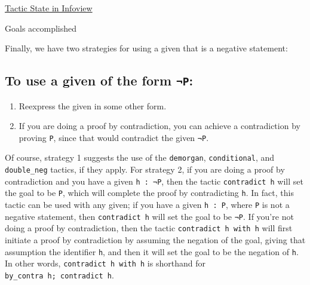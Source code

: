 \documentclass[
  letterpaper,
  DIV=11,
  numbers=noendperiod]{scrreprt}
\newenvironment{Shaded}{\begin{snugshade}}{\end{snugshade}}
\newcommand{\NormalTok}[1]{\textcolor[rgb]{0.00,0.23,0.31}{#1}}
\newcommand{\SpecialCharTok}[1]{\textcolor[rgb]{0.37,0.37,0.37}{#1}}
\providecommand{\tightlist}{%
  \setlength{\itemsep}{0pt}\setlength{\parskip}{0pt}}\usepackage{longtable,booktabs,array}
\renewcommand{\NormalTok}[1]{\textcolor[HTML]{000000}{#1}}
\renewcommand{\SpecialCharTok}[1]{}
\newcommand{\nobreakShaded}{\renewenvironment{Shaded}
	{\begin{tcolorbox}[frame hidden, enhanced, interior hidden, boxrule=0pt,
		borderline west={3pt}{0pt}{shadecolor}, sharp corners]}
	{\end{tcolorbox}}}
\newenvironment{outpt}
	{\nobreakShaded\begin{minipage}[t]{0.32\textwidth}}
	{\end{minipage}}
\theoremstyle{remark}
\begin{document}
\begin{outpt}

\uline{Tactic State in Infoview}

\begin{Shaded}
\begin{Highlighting}[]
\SpecialCharTok{!!}\NormalTok{Goals accomplished 🎉}
\end{Highlighting}
\end{Shaded}

\end{outpt}

Finally, we have two strategies for using a given that is a negative
statement:

\hypertarget{to-use-a-given-of-the-form-p}{%
\subsection{\texorpdfstring{To use a given of the form
\texttt{¬P}:}{To use a given of the form ¬P:}}\label{to-use-a-given-of-the-form-p}}

\begin{enumerate}
\def\labelenumi{\arabic{enumi}.}
\tightlist
\item
  Reexpress the given in some other form.
\item
  If you are doing a proof by contradiction, you can achieve a
  contradiction by proving \texttt{P}, since that would contradict the
  given \texttt{¬P}.
\end{enumerate}

Of course, strategy 1 suggests the use of the \texttt{demorgan},
\texttt{conditional}, and \texttt{double\_neg} tactics, if they apply.
For strategy 2, if you are doing a proof by contradiction and you have a
given \texttt{h\ :\ ¬P}, then the tactic \texttt{contradict\ h} will set
the goal to be \texttt{P}, which will complete the proof by
contradicting \texttt{h}. In fact, this tactic can be used with any
given; if you have a given \texttt{h\ :\ P}, where \texttt{P} is not a
negative statement, then \texttt{contradict\ h} will set the goal to be
\texttt{¬P}. If you're not doing a proof by contradiction, then the
tactic \texttt{contradict\ h\ with\ h\textquotesingle{}} will first
initiate a proof by contradiction by assuming the negation of the goal,
giving that assumption the identifier \texttt{h\textquotesingle{}}, and
then it will set the goal to be the negation of \texttt{h}. In other
words, \texttt{contradict\ h\ with\ h\textquotesingle{}} is shorthand
for \texttt{by\_contra\ h\textquotesingle{};\ contradict\ h}.
\end{document}
